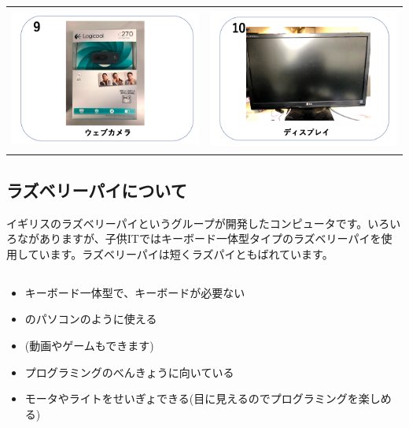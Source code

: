 \documentclass[a4paper,12pt]{jarticle}
\begin{document}
\begin{tabular}{cc}
  \includegraphics[width=6.488cm,height=4.697cm]{textbook-img002.png}
   &
  \includegraphics[width=6.488cm,height=4.697cm]{textbook-img001.png} \\
\end{tabular}

\subsection{ラズベリーパイについて}
イギリスのラズベリーパイというグループが開発したコンピュータです。いろいろながありますが、子供ITではキーボード一体型タイプのラズベリーパイを使用しています。ラズベリーパイは短くラズパイともばれています。

\subsection{}
\begin{itemize}
  \item キーボード一体型で、キーボードが必要ない
  \item {}のパソコンのように使える
  \item (動画やゲームもできます)
  \item
        プログラミングのべんきょうに向いている
  \item
        モータやライトをせいぎょできる(目に見えるのでプログラミングを楽しめる)
\end{itemize}
\end{document}
